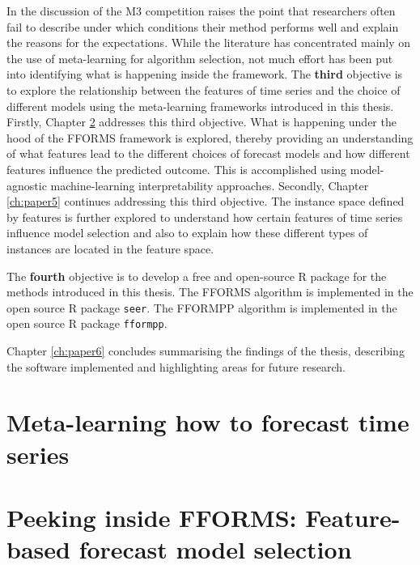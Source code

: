\documentclass{monashthesis}
\begin{document}
In the discussion of the M3 competition \textcite{armstrong2001s} raises the point that researchers often fail to describe under which conditions their method performs well and explain the reasons for the expectations. While the literature has concentrated mainly on the use of meta-learning for algorithm selection, not much effort has been put into identifying what is happening inside the framework. The \textbf{third} objective is to explore the relationship between the features of time series and the choice of different models using the meta-learning frameworks introduced in this thesis. Firstly, Chapter \ref{ch:paper3} addresses this third objective. What is happening under the hood of the FFORMS framework is explored, thereby providing an understanding of what features lead to the different choices of forecast models and how different features influence the predicted outcome. This is accomplished using model-agnostic machine-learning interpretability approaches. Secondly, Chapter \ref{ch:paper5} continues addressing this third objective. The instance space defined by features is further explored to understand how certain features of time series influence model selection and also to explain how these different types of instances are located in the feature space.

The \textbf{fourth} objective is to develop a free and open-source R package for the methods introduced in this thesis. The FFORMS algorithm is implemented in the open source R package \texttt{seer}. The FFORMPP algorithm is implemented in the open source R package \texttt{fformpp}.

Chapter \ref{ch:paper6} concludes summarising the findings of the thesis, describing the software implemented and highlighting areas for future research.

\hypertarget{ch:paper2}{%
\chapter{Meta-learning how to forecast time series}\label{ch:paper2}}



\hypertarget{ch:paper3}{%
\chapter{Peeking inside FFORMS: Feature-based forecast model selection}\label{ch:paper3}}


\end{document}
